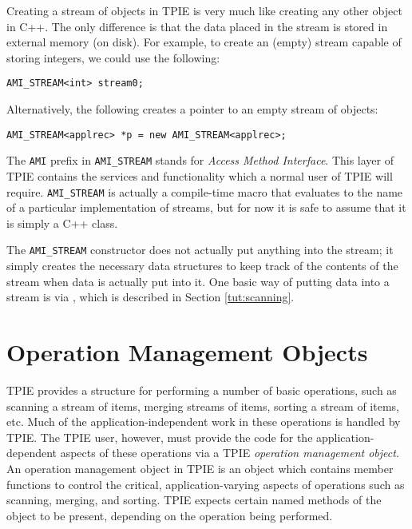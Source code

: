 Creating a stream of objects in TPIE is very much like
creating any other object in C++. The only difference is
that the data placed in the stream is stored in external
memory (on disk). 
For example, to create an (empty) stream 
capable of storing integers, we could use the following:
\begin{verbatim}
AMI_STREAM<int> stream0;
\end{verbatim}
Alternatively, the following creates a pointer
 to an empty stream of  objects:
\begin{verbatim}
AMI_STREAM<applrec> *p = new AMI_STREAM<applrec>;
\end{verbatim}

The {\tt AMI} prefix in {\tt AMI\_STREAM} stands for
\emph{Access Method Interface}. This layer of TPIE contains the
services and functionality which a normal user of TPIE will
require.  {\tt AMI\_STREAM} is actually a compile-time macro
that evaluates to the name of a particular implementation of
streams, but for now it is safe to assume that it is simply
a C++ class.

The {\tt AMI\_STREAM} constructor does not actually put
anything into the stream; it simply creates the necessary
data structures to keep track of the contents of the stream
when data is actually put into it.  One basic way of putting
data into a stream is via , which is
described in Section \ref{tut:scanning}.

\section{Operation Management Objects} 

TPIE provides a structure for performing a number of basic
operations, such as scanning a stream of items, merging
streams of items, sorting a stream of items, etc. Much of
the application-independent work in these operations is
handled by TPIE. The TPIE user, however, must provide the
code for the application-dependent aspects of these
operations via a TPIE {\em operation management object}. An
operation management object in TPIE is an object which
contains member functions to control the critical,
application-varying aspects of operations such as scanning,
merging, and sorting. TPIE expects certain named methods of
the object to be present, depending on the operation being
performed. 

